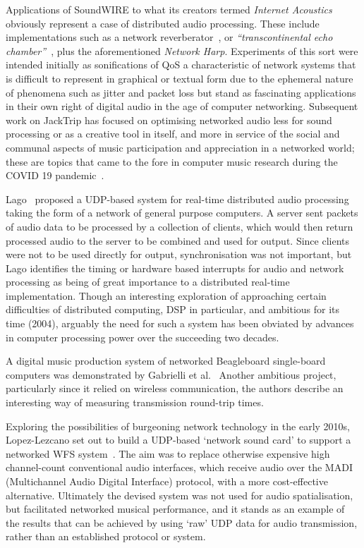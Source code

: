 Applications of SoundWIRE to what its creators termed \textit{Internet
Acoustics}~\citep{chafe_physical_2002} obviously represent a case of distributed
audio processing.
These include implementations such as a network
reverberator~\citep{chafe_i_2018}, or
\textit{``transcontinental echo chamber''}~\citep{chafe_simplified_2000},
plus the aforementioned \textit{Network Harp}.
Experiments of this sort were intended initially as sonifications of QoS
\textemdash{} a characteristic of network systems that is difficult to represent
in graphical or textual form due to the ephemeral nature of phenomena such as
jitter and packet loss \textemdash{} but stand as fascinating applications in
their own right of digital audio in the age of computer networking.
Subsequent work on JackTrip has focused on optimising networked audio less
for sound processing or as a creative tool in itself, and more in service of
the social and communal aspects of music participation and appreciation in a
networked world;
these are topics that came to the fore in computer music research during the
COVID 19 pandemic~\citep{bosi_experiencing_2021,sacchetto_jacktrip-webrtc_2021}.

Lago~\citep{lago_distributed_2004} proposed a UDP-based system for real-time
distributed audio processing taking the form of a network of general purpose
computers.
A server sent packets of audio data to be processed by a collection of
clients, which would then return processed audio to the server to be combined
and used for output.
Since clients were not to be used directly for output, synchronisation was not
important, but Lago identifies the timing or hardware based interrupts for
audio and network processing as being of great importance to a distributed
real-time implementation.
Though an interesting exploration of approaching certain difficulties of
distributed computing, DSP in particular, and ambitious for its time (2004),
arguably the need for such a system has been obviated by advances in computer
processing power over the succeeding two decades.

A digital music production system of networked Beagleboard single-board
computers was demonstrated by Gabrielli et al.~\citep{gabrielli_networked_2012}
Another ambitious project, particularly since it relied on wireless
communication, the authors describe an interesting way of measuring
transmission round-trip times.

Exploring the possibilities of burgeoning network technology in the early 2010s,
Lopez-Lezcano set out to build a UDP-based `network sound card' to support
a networked WFS system~\citep{lopez-lezcano_jack_2012}.
The aim was to replace otherwise expensive high channel-count conventional
audio interfaces, which receive audio over the MADI (Multichannel Audio Digital
Interface) protocol, with a more cost-effective alternative.
Ultimately the devised system was not used for audio spatialisation, but
facilitated networked musical performance, and it stands as an example of the
results that can be achieved by using `raw' UDP data for audio transmission,
rather than an established protocol or system.

